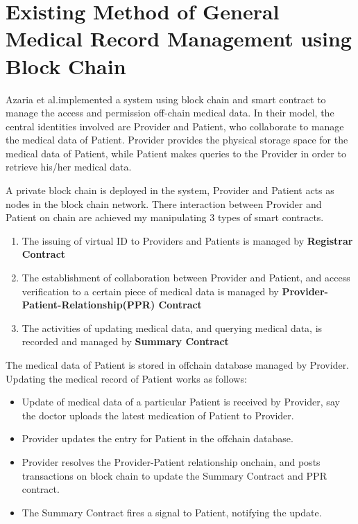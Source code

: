\documentclass[]{scrartcl}
\theoremstyle{definition}
\begin{document}
\section{Existing Method of General Medical Record Management using Block Chain}
Azaria et al.\cite{MedRecWhitePaper}implemented a system using block chain and smart contract to manage the access and permission off-chain medical data. In their model, the central identities involved are Provider and Patient, who collaborate to manage the medical data of Patient. Provider provides the physical storage space for the medical data of Patient, while Patient makes queries to the Provider in order to retrieve his/her medical data. 

A private block chain is deployed in the system, Provider and Patient acts as nodes in the block chain network. There interaction between Provider and Patient on chain are achieved my manipulating 3 types of smart contracts. 

\begin{enumerate}
\item The issuing of virtual ID to Providers and Patients is managed by \textbf{Registrar Contract}

\item The establishment of collaboration between Provider and Patient, and access verification to a certain piece of medical data is managed by \textbf{Provider-Patient-Relationship(PPR) Contract}

\item The activities of updating medical data, and querying medical data, is recorded and managed by \textbf{Summary Contract}
\end{enumerate}

The medical data of Patient is stored in offchain database managed by Provider.
Updating the medical record of Patient works as follows:
\begin{itemize}
\item Update of medical data of a particular Patient is received by Provider, say the doctor uploads the latest medication of Patient to Provider.

\item Provider updates the entry for  Patient in the offchain database.

\item Provider resolves the Provider-Patient relationship onchain, and posts transactions on block chain to update the Summary Contract and PPR contract.

\item The Summary Contract fires a signal to Patient, notifying the update.
\end{itemize}
\end{document}
